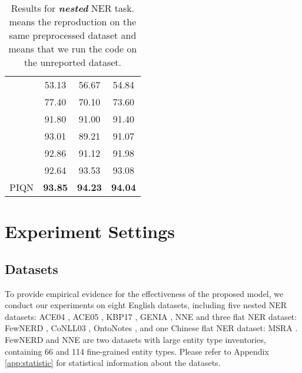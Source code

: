 \documentclass[11pt]{article}
\begin{document}
\begin{table}[]
\begin{tabular}{lccc}
\citet{li-etal-2020-unified} & 53.13  & 56.67  & 54.84  \\
\citet{wang-lu-2018-neural}       & 77.40 & 70.10 & 73.60  \\
\citet{ringland-etal-2019-nne}       & 91.80 & 91.00 & 91.40  \\



\citet{tan2021sequencetoset}  & 93.01 & 89.21 & 91.07     \\
\citet{shen2021locateandlabel} & 92.86 & 91.12 & 91.98  \\

\citet{wang-etal-2020-pyramid}       & 92.64  & 93.53  & 93.08     \\
\midrule
PIQN & \textbf{93.85} & \textbf{94.23} & \textbf{94.04} \\
\bottomrule

\end{tabular}
\caption{Results for \textit{\textbf{nested}} NER task.  means the reproduction on the same preprocessed dataset and  means that we run the code on the unreported dataset.}
\label{tab:nested}
\end{table}

















\section{Experiment Settings}
\subsection{Datasets}






To provide empirical evidence for the effectiveness of the proposed model, we conduct our experiments on eight English datasets, including five nested NER datasets: ACE04 \citep{doddington-etal-2004-automatic} , ACE05  \citep{2005-automatic}, KBP17 \citep{DBLP:conf/tac/JiPZNMMC17}, GENIA \citep{10.5555/1289189.1289260}, NNE\citep{ringland-etal-2019-nne} and three flat NER dataset: FewNERD \citep{ding-etal-2021-nerd}, CoNLL03 \citep{tjong-kim-sang-de-meulder-2003-introduction}, OntoNotes \citep{pradhan-etal-2013-towards}, and one Chinese flat NER dataset: MSRA \citep{levow-2006-third}.
FewNERD and NNE are two datasets with large entity type inventories, containing 66 and 114 fine-grained entity types.
Please refer to Appendix \ref{app:statistic} for statistical information about the datasets.
\end{document}
